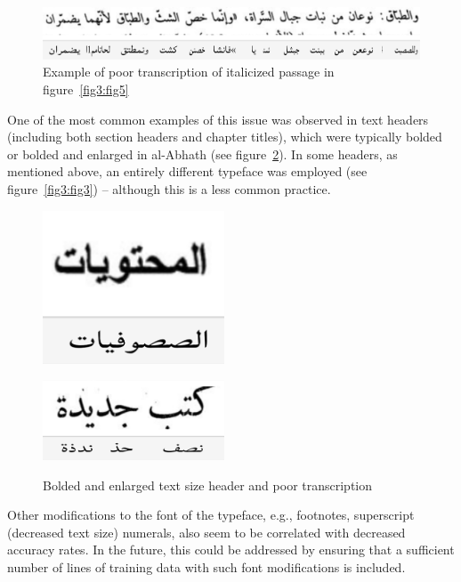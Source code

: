 \begin{figure}[h]
	\includegraphics[width=\linewidth]{images/image6.png}
	\caption{Example of poor transcription of italicized passage in figure~\protect\ref{fig3:fig5}}
	\label{fig3:fig6}
\end{figure}

One of the most common examples of this issue was observed in text headers
(including both section headers and chapter titles), which were typically
bolded or bolded and enlarged in al-Abhath (see figure~\ref{fig3:fig7}). In some
headers, as mentioned above, an entirely different typeface was employed (see
figure~\ref{fig3:fig3}) -- although this is a less common practice.

\begin{figure}
	\centering
	\includegraphics[width=0.48\textwidth]{images/image5.png}
 
	\includegraphics[width=0.48\textwidth]{images/image7.png}
	\label{fig3:fig7}
	\caption{Bolded and enlarged text size header and poor transcription}
\end{figure}

Other modifications to the font of the typeface, e.g., footnotes, superscript
(decreased text size) numerals, also seem to be correlated with decreased
accuracy rates. In the future, this could be addressed by ensuring that a
sufficient number of lines of training data with such font modifications is
included.

